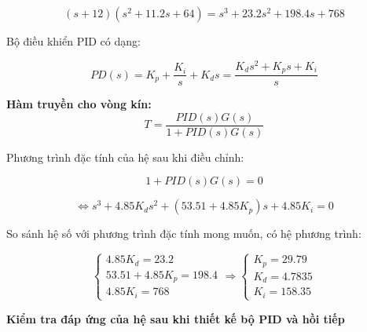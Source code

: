     \[
    (s + 12)(s^2 + 11.2s + 64) = s^3 + 23.2s^2 + 198.4s + 768
    \]

    Bộ điều khiển PID có dạng:

    \[
    PD(s) = K_p + \frac{K_i}{s} + K_d s = \frac{K_d s^2 + K_p s + K_i}{s}
    \]

    \textbf{Hàm truyền cho vòng kín:}
    \[
    T = \frac{PID(s)G(s)}{1 + PID(s)G(s)}
    \]

    Phương trình đặc tính của hệ sau khi điều chỉnh:

    \[
    1 + PID(s)G(s) = 0
    \]

    \[
    \Leftrightarrow s^3 + 4.85K_d s^2 + (53.51 + 4.85K_p)s + 4.85K_i = 0
    \]

    So sánh hệ số với phương trình đặc tính mong muốn, có hệ phương trình:

    \[
    \begin{cases}
    4.85K_d = 23.2 \\
    53.51 + 4.85K_p = 198.4 \\
    4.85K_i = 768
    \end{cases}
    \Rightarrow
    \begin{cases}
    K_p = 29.79 \\
    K_d = 4.7835 \\
    K_i = 158.35
    \end{cases}
    \]

    \textbf{Kiểm tra đáp ứng của hệ sau khi thiết kế bộ PID và hồi tiếp}

